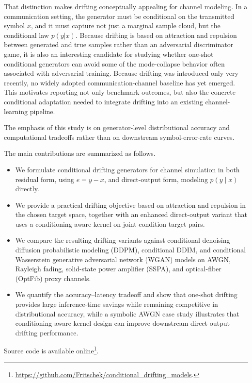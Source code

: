 \documentclass[conference]{IEEEtran}
\begin{document}
That distinction makes drifting conceptually appealing for channel modeling.
In a communication setting, the generator must be conditional on the transmitted symbol \(x\), and it must capture not just a marginal sample cloud, but the conditional law \(p(y | x)\). Because drifting is based on attraction and repulsion between generated and true samples rather than an adversarial discriminator game, it is also an interesting candidate for studying whether one-shot conditional generators can avoid some of the mode-collapse behavior often associated with adversarial training.
Because drifting was introduced only very recently, no widely adopted communication-channel baseline has yet emerged. This motivates reporting not only benchmark outcomes, but also the concrete conditional adaptation needed to integrate drifting into an existing channel-learning pipeline.

The emphasis of this study is on generator-level distributional accuracy and computational tradeoffs rather than on downstream symbol-error-rate curves.

The main contributions are summarized as follows.
\begin{itemize}
\item We formulate conditional drifting generators for channel simulation in both residual form,
  using \(e=y-x\), and direct-output form, modeling \(p(y \mid x)\) directly.
\item We provide a practical drifting objective based on attraction and repulsion in the chosen
  target space,  together with an enhanced direct-output variant that uses a conditioning-aware kernel on joint condition-target pairs.
\item We compare the resulting drifting variants against conditional denoising
diffusion probabilistic modeling (DDPM), conditional DDIM, and conditional Wasserstein
generative adversarial network (WGAN) models on AWGN, Rayleigh fading, solid-state power amplifier (SSPA), and optical-fiber (OptFib) proxy channels.
\item We quantify the accuracy--latency tradeoff and show that one-shot drifting provides large inference-time savings while remaining competitive in distributional accuracy, while a symbolic AWGN case study illustrates that conditioning-aware kernel design can improve downstream direct-output drifting performance.
\end{itemize}
Source code is available online\footnote{\url{https://github.com/Fritschek/conditional_drifting_models}.}.
\end{document}
